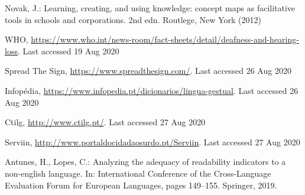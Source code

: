 \documentclass[runningheads]{llncs}
\begin{document}
%
%
%
% 
% 
%
\begin{thebibliography}{8}
        Novak, J.: Learning, creating, and using knowledge: concept maps as facilitative tools in schools and corporations. 2nd edn. Routlege, New York (2012)

        WHO, \url{https://www.who.int/news-room/fact-sheets/detail/deafness-and-hearing-loss}. Last accessed 19 Aug 2020

        Spread The Sign, \url{https://www.spreadthesign.com/}. Last accessed 26 Aug 2020

        Infopédia, \url{https://www.infopedia.pt/dicionarios/lingua-gestual}. Last accessed 26 Aug 2020

        Ctilg, \url{http://www.ctilg.pt/}. Last accessed 27 Aug 2020

        Serviin, \url{http://www.portaldocidadaosurdo.pt/Serviin}. Last accessed 27 Aug 2020

        Antunes, H., Lopes, C.: Analyzing the adequacy of readability indicators to a non-english language.
        In: International Conference of the Cross-Language Evaluation Forum for European Languages,
        pages 149--155. Springer, 2019.





\end{thebibliography}
\end{document}

